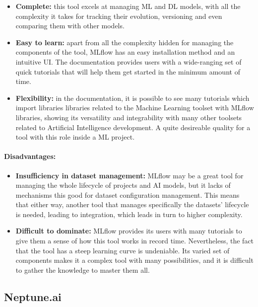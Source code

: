 \begin{itemize}
    \item \textbf{Complete: }this tool excels at managing \acrshort{ML} and \acrshort{DL} models, with all the complexity it takes for tracking 
    their evolution, versioning and even comparing them with other models.

    \item \textbf{Easy to learn: }apart from all the complexity hidden for managing the components of the tool, MLflow has an easy installation method
    and an intuitive \acrshort{UI}. The documentation provides users with a wide-ranging set of quick tutorials that will help them get started in the
    minimum amount of time.

    \item \textbf{Flexibility: }in the documentation, it is possible to see many tutorials which import libraries libraries related to the Machine Learning 
    toolset with MLflow libraries, showing its versatility and integrability with many other toolsets related to Artificial Intelligence development. 
    A quite desireable quality for a tool with this role inside a \acrshort{ML} project.
\end{itemize}

\paragraph{Disadvantages:}

\begin{itemize}
    \item \textbf{Insufficiency in dataset management: }MLflow may be a great tool for managing the whole lifecycle of projects and \acrshort{AI} models, 
    but it lacks of mechanisms this good for dataset configuration management. This means that either way, another tool that manages specifically the datasets' lifecycle
    is needed, leading to integration, which leads in turn to higher complexity.

    \item \textbf{Difficult to dominate: }MLflow provides its users with many tutorials to give them a sense of how this tool works in record time. Nevertheless,
    the fact that the tool has a steep learning curve is undeniable. Its varied set of components makes it a complex tool with many possibilities, and it is difficult
    to gather the knowledge to master them all.
\end{itemize}

\subsection{Neptune.ai}

